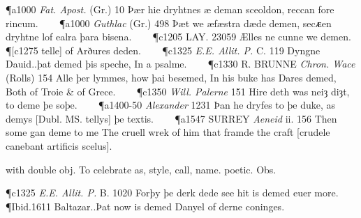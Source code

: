 \begin{description}[wide, labelwidth=!, labelindent=0pt]
\begin{myenumerate}
\P a1000 \textit{Fat.  Apost.} (Gr.) 10 Þær hie dryhtnes æ deman sceoldon, reccan fore rincum.    
\P a1000 \textit{Guthlac}  (Gr.) 498 Þæt we æfæstra dæde demen, secᴁen dryhtne lof ealra þara bisena.    
\P c1205 LAY. 23059 Ælles ne cunne we demen.
\P [c1275 telle]  of Arðures deden.    
\P c1325  \textit{E.E. Allit. P.} C. 119 Dyngne Dauid..þat demed þis speche, In a psalme.    
\P c1330 R. BRUNNE  \textit{Chron. Wace} (Rolls) 154 Alle þer lymmes, how þai besemed, In his buke has Dares demed, Both of Troie \& of Grece.    
\P c1350  \textit{Will. Palerne} 151 Hire deth was neiȝ diȝt, to deme þe soþe.    
\P a1400-50  \textit{Alexander} 1231 Þan  he dryfes to þe duke, as demys [Dubl. MS. tellys] þe textis.    
\P a1547 SURREY  \textit{Aeneid} ii. 156 Then some gan deme to me The cruell wrek of him that framde the craft [crudele canebant artificis scelus].

 with double obj. To celebrate as, style, call, name. poetic. Obs.

\P c1325  \textit{E.E. Allit. P.} B. 1020 Forþy  þe derk dede see hit is demed euer more.    
\P Ibid.1611 Baltazar..Þat now is demed Danyel of derne coninges.
\end{myenumerate}














\end{description}
